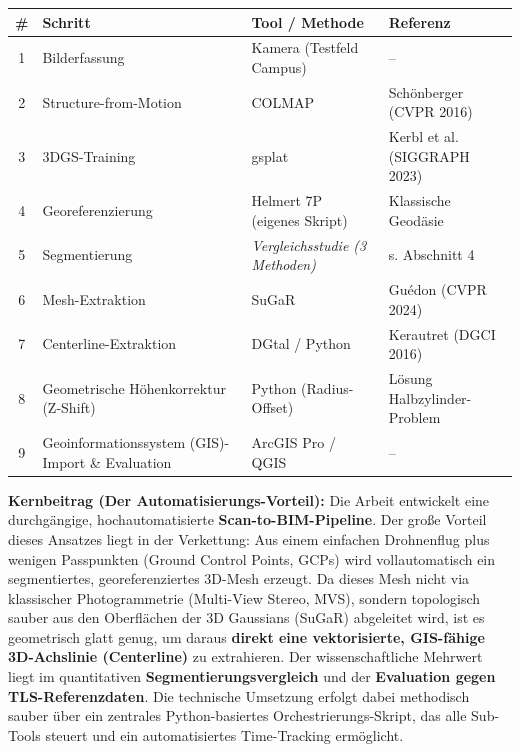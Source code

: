 \documentclass[11pt, a4paper]{article}
\begin{document}
\begin{center}
    \small
    \begin{tabular}{c p{4.5cm} p{5.5cm} p{4cm}}
        \toprule
        \textbf{\#} & \textbf{Schritt}                                 & \textbf{Tool / Methode}                & \textbf{Referenz}            \\
        \midrule
        1           & Bilderfassung                                    & Kamera (Testfeld Campus)               & --                           \\
        2           & Structure-from-Motion                            & COLMAP                                 & Sch\"onberger (CVPR 2016)    \\
        3           & 3DGS-Training                                    & gsplat                                 & Kerbl et al. (SIGGRAPH 2023) \\
        4           & Georeferenzierung                                & Helmert 7P (eigenes Skript)            & Klassische Geod\"asie        \\
        5           & Segmentierung                                    & \textit{Vergleichsstudie (3 Methoden)} & s. Abschnitt 4               \\
        6           & Mesh-Extraktion                                  & SuGaR                                  & Gu\'edon (CVPR 2024)         \\
        7           & Centerline-Extraktion                            & DGtal / Python                         & Kerautret (DGCI 2016)        \\
        8           & Geometrische H\"ohenkorrektur (Z-Shift)          & Python (Radius-Offset)                 & L\"osung Halbzylinder-Problem \\
        9           & Geoinformationssystem (GIS)-Import \& Evaluation & ArcGIS Pro / QGIS                      & --                           \\
        \bottomrule
    \end{tabular}
\end{center}

\textbf{Kernbeitrag (Der Automatisierungs-Vorteil):} Die Arbeit entwickelt eine durchg\"angige, hochautomatisierte \textbf{Scan-to-BIM-Pipeline}. Der gro\ss e Vorteil dieses Ansatzes liegt in der Verkettung: Aus einem einfachen Drohnenflug plus wenigen Passpunkten (Ground Control Points, GCPs) wird vollautomatisch ein segmentiertes, georeferenziertes 3D-Mesh erzeugt. Da dieses Mesh nicht via klassischer Photogrammetrie (Multi-View Stereo, MVS), sondern topologisch sauber aus den Oberfl\"achen der 3D Gaussians (SuGaR) abgeleitet wird, ist es geometrisch glatt genug, um daraus \textbf{direkt eine vektorisierte, GIS-f\"ahige 3D-Achslinie (Centerline)} zu extrahieren. Der wissenschaftliche Mehrwert liegt im quantitativen \textbf{Segmentierungsvergleich} und der \textbf{Evaluation gegen TLS-Referenzdaten}. Die technische Umsetzung erfolgt dabei methodisch sauber \"uber ein zentrales Python-basiertes Orchestrierungs-Skript, das alle Sub-Tools steuert und ein automatisiertes Time-Tracking erm\"oglicht.
\end{document}
